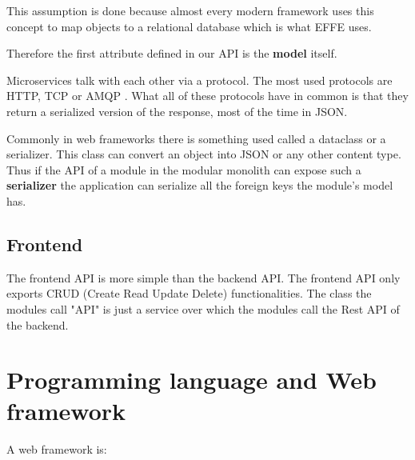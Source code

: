 This assumption is done because almost every modern framework uses this concept to map objects to a relational database which is what EFFE uses.

Therefore the first attribute defined in our API is the \textbf{model} itself.

Microservices talk with each other via a protocol. The most used protocols are HTTP, TCP or AMQP \cite{microservicesAPI}. What all of these protocols have in common is that they return a serialized version of the response, most of the time in JSON.

Commonly in web frameworks there is something used called a dataclass or a serializer. This class can convert an object into JSON or any other content type. Thus if the API of a module in the modular monolith can expose such a \textbf{serializer} the application can serialize all the foreign keys the module's model has.



\subsection*{Frontend}

The frontend API is more simple than the backend API. The frontend API only exports CRUD (Create Read Update Delete) functionalities. The class the modules call "API" is just a service over which the modules call the Rest API of the backend.

\section{Programming language and Web framework}

A web framework is:


